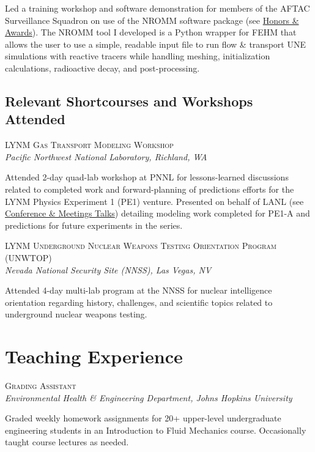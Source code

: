 \documentclass[11pt, letterpaper]{article}
\newcommand{\years}[1]{\marginnote{\scriptsize #1}}
\begin{document}
    Led a training workshop and software demonstration for members of the AFTAC
     Surveillance Squadron on use of the NROMM software package (see
    \hyperref[sec:awards]{Honors \& Awards}).  The NROMM tool I developed is a
    Python wrapper for FEHM that allows the user to use a simple, readable
    input file to run flow \& transport UNE simulations with reactive tracers
    while handling meshing, initialization calculations, radioactive decay, and
    post-processing.

\subsection*{Relevant Shortcourses and Workshops Attended}
\label{sec:shortcourses}
\years{2026} \textsc{LYNM Gas Transport Modeling Workshop}\\
\textit{Pacific Northwest National Laboratory, Richland, WA}

    Attended 2-day quad-lab workshop at PNNL for lessons-learned discussions related to 
    completed work and forward-planning of predictions efforts for the
    LYNM Physics Experiment 1 (PE1) venture. Presented on behalf of LANL (see
    \hyperref[sec:conference-talks]{Conference \& Meetings Talks}) detailing
    modeling work completed for PE1-A and predictions for future experiments in
    the series. 

\years{2023} \textsc{LYNM Underground Nuclear Weapons Testing Orientation Program (UNWTOP)}\\
\textit{Nevada National Security Site (NNSS), Las Vegas, NV}

    Attended 4-day multi-lab program at the NNSS for nuclear intelligence
    orientation regarding history, challenges, and scientific topics related to
    underground nuclear weapons testing. 


\section*{Teaching Experience}
\noindent
\years{2019}\textsc{Grading Assistant}\\
\textit{Environmental Health \& Engineering Department, Johns Hopkins University}

	Graded weekly homework assignments for 20+ upper-level undergraduate
	engineering students in an Introduction to Fluid Mechanics course.
	Occasionally taught course lectures as needed.\\
\end{document}
